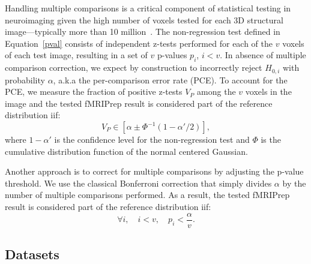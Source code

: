 \documentclass{article}
\newcommand{\fmriprep}{fMRIPrep \xspace}
\begin{document}
Handling multiple comparisons is a critical component of statistical testing in neuroimaging given the high number of voxels tested for each 3D structural image---typically more than 10 million~\cite{NICHOLS2007246}. The non-regression test defined in Equation~\ref{pval} consists of independent z-tests performed for each of the $v$ voxels of each test image, resulting in a set of $v$ p-values $p_i$, $i < v$. In absence of multiple comparison correction, we expect by construction to incorrectly reject $H_{0,i}$ with probability $\alpha$, a.k.a the per-comparison error rate (PCE). To account for the PCE, we measure the fraction of positive z-tests $V_P$ among the $v$ voxels in the image and the tested \fmriprep result is considered part of the reference distribution iif:
\begin{equation}
 V_{P} \in [ \alpha \pm \Phi^{-1}(1-\alpha'/2)  ], \label{eq:pce}
\end{equation}
where $1-\alpha'$ is the confidence level for the non-regression test and $\Phi$ is the cumulative distribution function of the normal centered Gaussian. 

Another approach is to correct for multiple comparisons by adjusting the p-value threshold. 
We use the classical Bonferroni correction that simply divides $\alpha$ by the number of multiple comparisons performed. As a result, the tested \fmriprep result is considered part of the reference distribution iif:
\begin{equation}
\forall i, \quad i < v, \quad p_i < \frac{\alpha}{v}. \label{eq:bonferroni}
\end{equation}



\subsection{Datasets}
\end{document}
